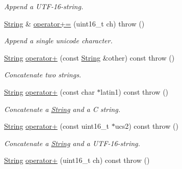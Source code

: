 \begin{CompactItemize}
\begin{CompactList}\small\item\em Append a UTF-16-string. \item\end{CompactList}\item 
\hypertarget{classpmath_1_1_string_7e8c3588f54b9fb2f7db23919c4256ef}{
\hyperlink{classpmath_1_1_string}{String} \& \hyperlink{classpmath_1_1_string_7e8c3588f54b9fb2f7db23919c4256ef}{operator+=} (uint16\_\-t ch)  throw ()}
\label{classpmath_1_1_string_7e8c3588f54b9fb2f7db23919c4256ef}

\begin{CompactList}\small\item\em Append a single unicode character. \item\end{CompactList}\item 
\hypertarget{classpmath_1_1_string_1fc7e448c98ab6b1035b24b8786dccfa}{
\hyperlink{classpmath_1_1_string}{String} \hyperlink{classpmath_1_1_string_1fc7e448c98ab6b1035b24b8786dccfa}{operator+} (const \hyperlink{classpmath_1_1_string}{String} \&other) const   throw ()}
\label{classpmath_1_1_string_1fc7e448c98ab6b1035b24b8786dccfa}

\begin{CompactList}\small\item\em Concatenate two strings. \item\end{CompactList}\item 
\hypertarget{classpmath_1_1_string_80e5d855cbb29b3593b20bbcf2effb82}{
\hyperlink{classpmath_1_1_string}{String} \hyperlink{classpmath_1_1_string_80e5d855cbb29b3593b20bbcf2effb82}{operator+} (const char $\ast$latin1) const   throw ()}
\label{classpmath_1_1_string_80e5d855cbb29b3593b20bbcf2effb82}

\begin{CompactList}\small\item\em Concatenate a \hyperlink{classpmath_1_1_string}{String} and a C string. \item\end{CompactList}\item 
\hypertarget{classpmath_1_1_string_e797b60c4398bc0b791c6a41e0afebbf}{
\hyperlink{classpmath_1_1_string}{String} \hyperlink{classpmath_1_1_string_e797b60c4398bc0b791c6a41e0afebbf}{operator+} (const uint16\_\-t $\ast$ucs2) const   throw ()}
\label{classpmath_1_1_string_e797b60c4398bc0b791c6a41e0afebbf}

\begin{CompactList}\small\item\em Concatenate a \hyperlink{classpmath_1_1_string}{String} and a UTF-16-string. \item\end{CompactList}\item 
\hypertarget{classpmath_1_1_string_880de03578539ffe80c0dd4480993241}{
\hyperlink{classpmath_1_1_string}{String} \hyperlink{classpmath_1_1_string_880de03578539ffe80c0dd4480993241}{operator+} (uint16\_\-t ch) const   throw ()}
\label{classpmath_1_1_string_880de03578539ffe80c0dd4480993241}


\end{CompactItemize}
